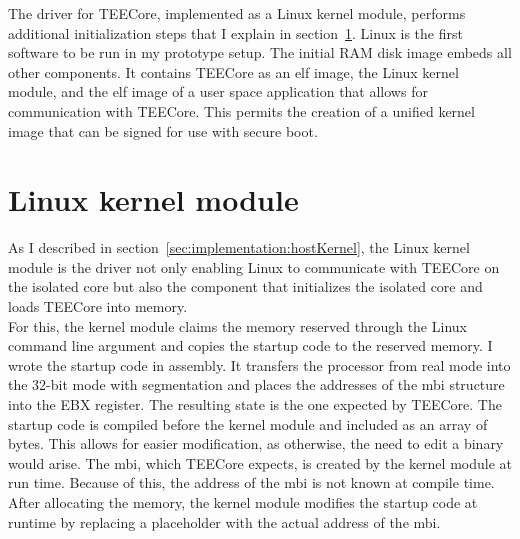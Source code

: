 The driver for TEECore, implemented as a Linux kernel module, performs
additional initialization steps that I explain in
section~\ref{sec:implementation:kmod}. Linux is the first software to be run in
my prototype setup. The initial RAM disk image embeds all other components. It
contains TEECore as an \gls{elf} image, the Linux kernel module, and the
\gls{elf} image of a user space application that allows for communication with
TEECore. This permits the creation of a unified kernel image that can be signed
for use with secure boot.\\

\section{Linux kernel module}
\label{sec:implementation:kmod}
As I described in section~\ref{sec:implementation:hostKernel}, the Linux kernel
module is the driver not only enabling Linux to communicate with TEECore on the
isolated core but also the component that initializes the isolated core and
loads TEECore into memory.\\

For this, the kernel module claims the memory reserved through the Linux command
line argument and copies the startup code to the reserved memory. I wrote the
startup code in assembly. It transfers the processor from real mode into the
32-bit mode with segmentation and places the addresses of the \gls{mbi}
structure into the EBX register. The resulting state is the one expected by
TEECore. The startup code is compiled before the kernel module and included as
an array of bytes. This allows for easier modification, as otherwise, the need
to edit a binary would arise. The \gls{mbi}, which TEECore expects, is created
by the kernel module at run time. Because of this, the address of the \gls{mbi}
is not known at compile time. After allocating the memory, the kernel module
modifies the startup code at runtime by replacing a placeholder with the actual
address of the \gls{mbi}.\\


